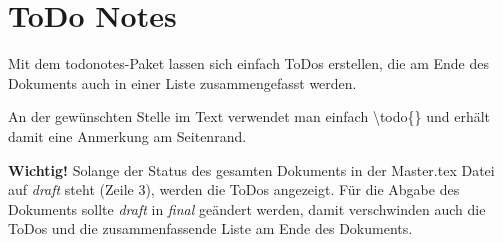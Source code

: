 \section{ToDo Notes}
Mit dem todonotes-Paket lassen sich einfach ToDos erstellen, die am Ende des Dokuments auch in einer Liste zusammengefasst werden.

An der gewünschten Stelle im Text verwendet man einfach \textbackslash todo\{<Anmerkung oder Aufgabe>\} und erhält damit eine Anmerkung am Seitenrand.

\textbf{Wichtig!} Solange der Status des gesamten Dokuments in der Master.tex Datei auf \textit{draft} steht (Zeile 3), werden die ToDos angezeigt. Für die Abgabe des Dokuments sollte \textit{draft} in \textit{final} geändert werden, damit verschwinden auch die ToDos und die zusammenfassende Liste am Ende des Dokuments.